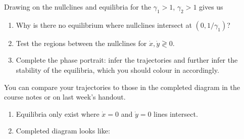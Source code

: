 \documentclass[a4paper,12pt]{article}
\begin{document}
\begin{enumerate}[label={\bf \arabic{*}.\;}, ref={\arabic{*}},itemsep=3ex, left=0ex]
{      Drawing on the nullclines and equilibria for the $\gamma_1>1$, $\gamma_2>1$ gives us
      \begin{center}
        
      \end{center}
      \begin{enumerate}[label=(\alph*)]
        \item Why is there no equilibrium where nullclines intersect at $(0,1/\gamma_1)$?
        \item Test the regions between the nullclines for $\dot{x},\dot{y} \gtrless 0$.
        \item Complete the phase portrait: infer the trajectories and further infer the stability of the equilibria, which you should colour in accordingly.
      \end{enumerate}
      You can compare your trajectories to those in the completed diagram in the course notes or on last week's handout.
    }
    { %
      \begin{enumerate}[label=(\alph*)]
        \item Equilibria only exist where $\dot{x}=0$ and $\dot{y}=0$ lines intersect.
        \item Completed diagram looks like:
      \end{enumerate}
      \begin{center}
        
      \end{center}
    }


\end{enumerate}
\end{document}
